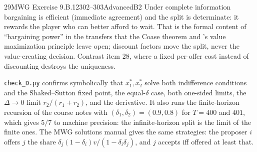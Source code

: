 \begin{exsol}{29}{MWG Exercise 9.B.12}{302--303}{Advanced}{B2}
\interp Under complete information bargaining is efficient (immediate agreement) and the split is
determinate: it rewards the player who can better afford to wait. That is the formal content of
``bargaining power'' in the transfers that the Coase theorem and \MR's value maximization
principle leave open; discount factors move the split, never the value-creating decision.
Contrast item 28, where a fixed per-offer cost instead of discounting destroys the uniqueness.

\verify \texttt{check\_D.py} confirms symbolically that $x_1^*, x_2^*$ solve both indifference
conditions and the Shaked--Sutton fixed point, the equal-$\delta$ case, both one-sided limits, the
$\Delta \to 0$ limit $r_2/(r_1+r_2)$, and the derivative. It also runs the finite-horizon recursion
of the course notes with $(\delta_1, \delta_2) = (0.9, 0.8)$ for $T = 400$ and $401$, which gives
$5/7$ to machine precision: the infinite-horizon split is the limit of the finite ones. The MWG
solutions manual gives the same strategies: the proposer $i$ offers $j$ the share
$\delta_j(1-\delta_i)v/(1-\delta_i\delta_j)$, and $j$ accepts iff offered at least that.

\end{exsol}

